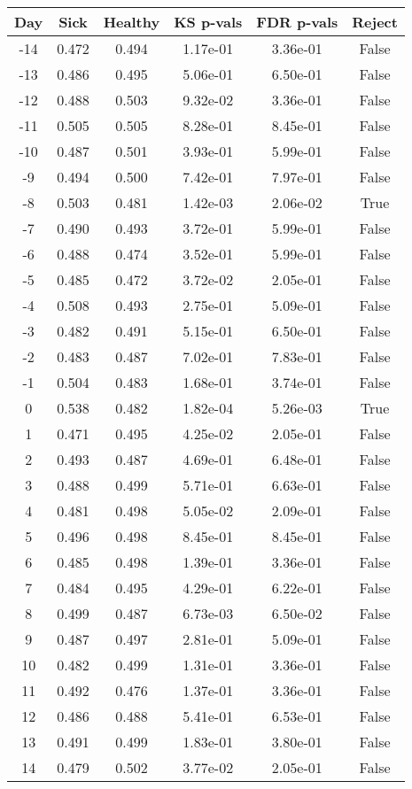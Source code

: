 \begin{tabular}{c|c|c|c|c|c}
Day &  Sick & Healthy &  KS p-vals & FDR p-vals & Reject\\
\hline
-14 & 0.472 &   0.494 &   1.17e-01 &   3.36e-01 &  False\\
-13 & 0.486 &   0.495 &   5.06e-01 &   6.50e-01 &  False\\
-12 & 0.488 &   0.503 &   9.32e-02 &   3.36e-01 &  False\\
-11 & 0.505 &   0.505 &   8.28e-01 &   8.45e-01 &  False\\
-10 & 0.487 &   0.501 &   3.93e-01 &   5.99e-01 &  False\\
 -9 & 0.494 &   0.500 &   7.42e-01 &   7.97e-01 &  False\\
 -8 & 0.503 &   0.481 &   1.42e-03 &   2.06e-02 &   True\\
 -7 & 0.490 &   0.493 &   3.72e-01 &   5.99e-01 &  False\\
 -6 & 0.488 &   0.474 &   3.52e-01 &   5.99e-01 &  False\\
 -5 & 0.485 &   0.472 &   3.72e-02 &   2.05e-01 &  False\\
 -4 & 0.508 &   0.493 &   2.75e-01 &   5.09e-01 &  False\\
 -3 & 0.482 &   0.491 &   5.15e-01 &   6.50e-01 &  False\\
 -2 & 0.483 &   0.487 &   7.02e-01 &   7.83e-01 &  False\\
 -1 & 0.504 &   0.483 &   1.68e-01 &   3.74e-01 &  False\\
  0 & 0.538 &   0.482 &   1.82e-04 &   5.26e-03 &   True\\
  1 & 0.471 &   0.495 &   4.25e-02 &   2.05e-01 &  False\\
  2 & 0.493 &   0.487 &   4.69e-01 &   6.48e-01 &  False\\
  3 & 0.488 &   0.499 &   5.71e-01 &   6.63e-01 &  False\\
  4 & 0.481 &   0.498 &   5.05e-02 &   2.09e-01 &  False\\
  5 & 0.496 &   0.498 &   8.45e-01 &   8.45e-01 &  False\\
  6 & 0.485 &   0.498 &   1.39e-01 &   3.36e-01 &  False\\
  7 & 0.484 &   0.495 &   4.29e-01 &   6.22e-01 &  False\\
  8 & 0.499 &   0.487 &   6.73e-03 &   6.50e-02 &  False\\
  9 & 0.487 &   0.497 &   2.81e-01 &   5.09e-01 &  False\\
 10 & 0.482 &   0.499 &   1.31e-01 &   3.36e-01 &  False\\
 11 & 0.492 &   0.476 &   1.37e-01 &   3.36e-01 &  False\\
 12 & 0.486 &   0.488 &   5.41e-01 &   6.53e-01 &  False\\
 13 & 0.491 &   0.499 &   1.83e-01 &   3.80e-01 &  False\\
 14 & 0.479 &   0.502 &   3.77e-02 &   2.05e-01 &  False\\
\end{tabular}